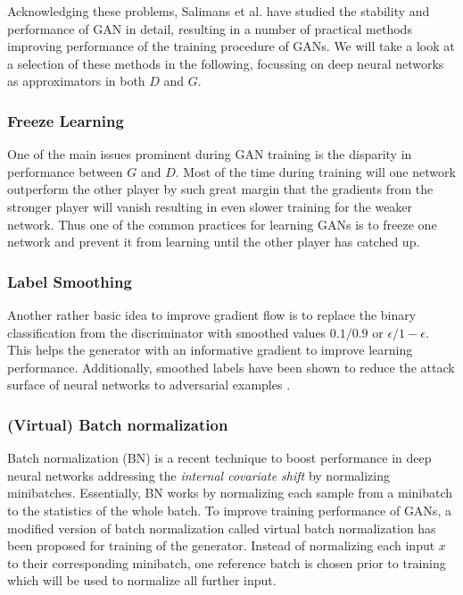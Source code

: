 
Acknowledging these problems, Salimans et al.\cite{improved_gan:2016} have studied the stability and performance of GAN in detail, resulting in a number of practical methods improving performance of the training procedure of GANs.
We will take a look at a selection of these methods in the following, focussing on deep neural networks as approximators in both $D$ and $G$.

\subsubsection{Freeze Learning}
\label{ssub:gan_freeze_learning}
One of the main issues prominent during GAN training is the disparity in performance between $G$ and $D$.
Most of the time during training will one network outperform the other player by such great margin that the gradients from the stronger player will vanish resulting in even slower training for the weaker network.
Thus one of the common practices\cite{improved_gan:2016}\cite{dcgan:2015} for learning GANs is to freeze one network and prevent it from learning until the other player has catched up.


\subsubsection{Label Smoothing \cite{improved_gan:2016}}
\label{ssub:gan_label_smoothing}
Another rather basic idea to improve gradient flow is to replace the binary classification from the discriminator with smoothed values $0.1/0.9$ or $\epsilon/1-\epsilon$.
This helps the generator with an informative gradient to improve learning performance.
Additionally, smoothed labels have been shown to reduce the attack surface of neural networks to adversarial examples \cite{adv_examples:2016}.


\subsubsection{(Virtual) Batch normalization}
\label{ssub:gan_batch_norm}
Batch normalization (BN) \cite{batch_norm:2015} is a recent technique to boost performance in deep neural networks addressing the \emph{internal covariate shift} by normalizing minibatches.
Essentially, BN works by normalizing each sample from a minibatch to the statistics of the whole batch.
To improve training performance of GANs, a modified version of batch normalization called virtual batch normalization has been proposed \cite{improved_gan:2016} for training of the generator.
Instead of normalizing each input $x$ to their corresponding minibatch, one reference batch is chosen prior to training which will be used to normalize all further input.

